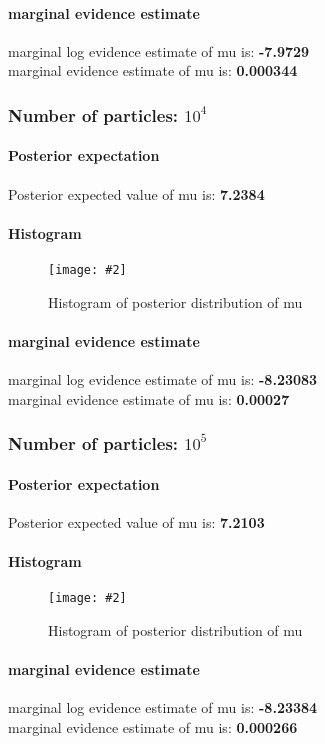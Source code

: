 \documentclass{article}
\newcommand{\centerfigcap}[3]{\begin{figure}[H]
\begin{center}\texttt{[image: \#2]} \caption{#3}\end{center}
\end{figure}}
\begin{document}
\paragraph{marginal evidence estimate}
marginal log evidence estimate of mu is: \textbf{-7.9729}\\
marginal evidence estimate of mu is: \textbf{0.000344}\\

\pagebreak
\subsubsection{Number of particles: $10^4$}
\paragraph{Posterior expectation}
Posterior expected value of mu is: \textbf{7.2384}\\

\paragraph{Histogram}
\centerfigcap{0.6}{../Figures/Histogram_2_4}{Histogram of posterior distribution of mu}
\paragraph{marginal evidence estimate}
marginal log evidence estimate of mu is: \textbf{-8.23083}\\
marginal evidence estimate of mu is: \textbf{0.00027}\\

\pagebreak
\subsubsection{Number of particles: $10^5$}
\paragraph{Posterior expectation}
Posterior expected value of mu is: \textbf{7.2103}\\

\paragraph{Histogram}
\centerfigcap{0.6}{../Figures/Histogram_2_5}{Histogram of posterior distribution of mu}
\paragraph{marginal evidence estimate}
marginal log evidence estimate of mu is: \textbf{-8.23384}\\
marginal evidence estimate of mu is: \textbf{0.000266}\\
\end{document}
